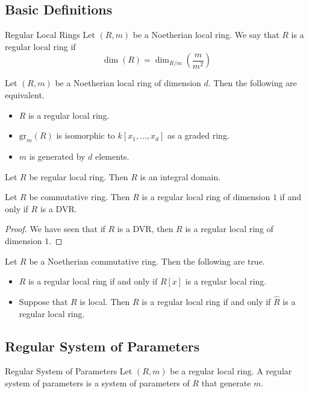 \documentclass[a4paper]{article}
\begin{document}
\subsection{Basic Definitions}
\begin{defn}{Regular Local Rings}{} Let $(R,m)$ be a Noetherian local ring. We say that $R$ is a regular local ring if $$\dim(R)=\dim_{R/m}\left(\frac{m}{m^2}\right)$$
\end{defn}

\begin{prp}{}{} Let $(R,m)$ be a Noetherian local ring of dimension $d$. Then the following are equivalent. 
\begin{itemize}
\item $R$ is a regular local ring. 
\item $\text{gr}_m(R)$ is isomorphic to $k[x_1,\dots,x_d]$ as a graded ring. 
\item $m$ is generated by $d$ elements. 
\end{itemize}
\end{prp}

\begin{lmm}{}{} Let $R$ be regular local ring. Then $R$ is an integral domain. 
\end{lmm}

\begin{lmm}{}{} Let $R$ be commutative ring. Then $R$ is a regular local ring of dimension $1$ if and only if $R$ is a DVR. 
\begin{proof}
We have seen that if $R$ is a DVR, then $R$ is a regular local ring of dimension $1$. 
\end{proof}
\end{lmm}

\begin{lmm}{}{} Let $R$ be a Noetherian commutative ring. Then the following are true. 
\begin{itemize}
\item $R$ is a regular local ring if and only if $R[x]$ is a regular local ring. 
\item Suppose that $R$ is local. Then $R$ is a regular local ring if and only if $\widehat{R}$ is a regular local ring. 
\end{itemize}
\end{lmm}

\subsection{Regular System of Parameters}
\begin{defn}{Regular System of Parameters}{} Let $(R,m)$ be a regular local ring. A regular system of parameters is a system of parameters of $R$ that generate $m$. 
\end{defn}
\end{document}
